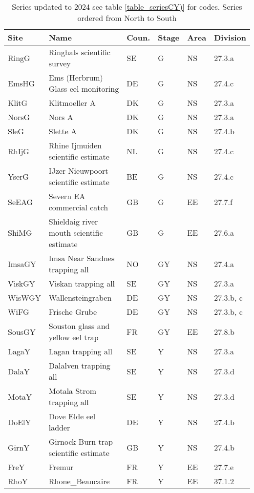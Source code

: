 \begin{table}[htbp]
\centering
\caption{Series updated to 2024 see table \ref{table_seriesCY)} for codes. Series ordered from North to South} 
\label{table_seriesCYm1}
\begin{tabularx}{\textwidth}{p{1.3cm}p{6.5cm}p{1cm}p{1cm}p{1cm}p{1.4cm}}
  \hline
Site & Name & Coun. & Stage & Area & Division \\ 
  \hline
RingG & Ringhals scientific survey & SE & G & NS & 27.3.a \\ 
  EmsHG & Ems (Herbrum) Glass eel monitoring & DE & G & NS & 27.4.c \\ 
  KlitG & Klitmoeller A & DK & G & NS & 27.3.a \\ 
  NorsG & Nors A & DK & G & NS & 27.3.a \\ 
  SleG & Slette A & DK & G & NS & 27.4.b \\ 
  RhIjG & Rhine Ijmuiden scientific estimate & NL & G & NS & 27.4.c \\ 
  YserG & IJzer Nieuwpoort scientific estimate & BE & G & NS & 27.4.c \\ 
  SeEAG & Severn EA commercial catch & GB & G & EE & 27.7.f \\ 
  ShiMG & Shieldaig river mouth scientific estimate & GB & G & EE & 27.6.a \\ 
  ImsaGY & Imsa Near Sandnes trapping all & NO & GY & NS & 27.4.a \\ 
  ViskGY & Viskan trapping all & SE & GY & NS & 27.3.a \\ 
  WisWGY & Wallensteingraben & DE & GY & NS & 27.3.b, c \\ 
  WiFG & Frische Grube & DE & GY & NS & 27.3.b, c \\ 
  SousGY & Souston glass and yellow eel trap & FR & GY & EE & 27.8.b \\ 
  LagaY & Lagan  trapping all & SE & Y & NS & 27.3.a \\ 
  DalaY & Dalalven  trapping all & SE & Y & NS & 27.3.d \\ 
  MotaY & Motala Strom  trapping all & SE & Y & NS & 27.3.d \\ 
  DoElY & Dove Elde eel ladder & DE & Y & NS & 27.4.b \\ 
  GirnY & Girnock Burn trap scientific estimate & GB & Y & NS & 27.4.b \\ 
  FreY & Fremur & FR & Y & EE & 27.7.e \\ 
  RhoY & Rhone\_Beaucaire & FR & Y & EE & 37.1.2 \\ 
   \hline
\end{tabularx}
\end{table}
